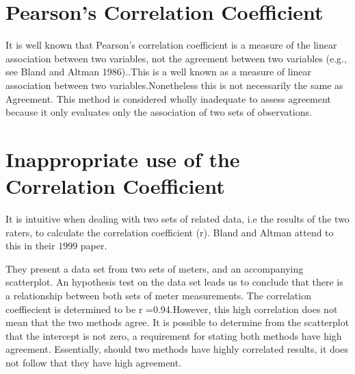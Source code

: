\documentclass[12pt, a4paper]{report}
\theoremstyle{plain}
\theoremstyle{definition}
\theoremstyle{remark}
\begin{document}
	
	


	\section{Pearson's Correlation Coefficient} It is well known that
	Pearson's correlation coefficient is a measure of the linear
	association between two variables, not the agreement between two
	variables (e.g., see Bland and Altman 1986)..This is a well known
	as a measure of linear association between two
	variables.Nonetheless this is not necessarily the same as
	Agreement. This method is considered wholly inadequate to assess
	agreement because it only evaluates only the association of two
	sets of observations.



	
	\newpage
	\section{Inappropriate use of the Correlation Coefficient}
	It is intuitive when dealing with two sets of related data, i.e
	the results of the two raters,  to calculate the correlation
	coefficient (r). Bland and Altman attend to this in their $1999$
	paper.
	
	They present a data set from two sets of meters, and an
	accompanying scatterplot. An hypothesis test on the data set leads
	us to conclude that there is a relationship between both sets of
	meter measurements. The correlation coeffiecient is determined to
	be r =0.94.However, this high correlation does not mean that the
	two methods agree. It is possible to determine from the
	scatterplot that the intercept is not zero, a requirement for
	stating both methods have high agreement. Essentially, should two
	methods have highly correlated results, it does not follow that
	they have high agreement.
	

	
\end{document}
